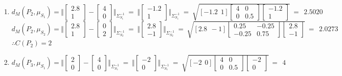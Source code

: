 \documentclass[letterpaper]{article}
\begin{document}
\begin{enumerate}
\begin{enumerate}
	\item[(ii)] $ d_{M}(P_2 , \mu_{S_1}) = \Vert \begin{bmatrix} 2.8 \\ 1\end{bmatrix} - \begin{bmatrix} 4 \\ 0\end{bmatrix} \Vert_{\Sigma^{-1}_{S_1}} ~=~ \Vert \begin{bmatrix} -1.2 \\ 1\end{bmatrix} \Vert_{\Sigma^{-1}_{S_1}} ~=
	~ \sqrt{[-1.2 ~~ 1] \begin{bmatrix}4 & 0 \\ 0 & 0.5\end{bmatrix} \begin{bmatrix}-1.2 \\ 1 \end{bmatrix}} ~=~~2.5020$	\\ \vskip 1mm	
	$ d_{M}(P_2 , \mu_{S_2}) = \Vert \begin{bmatrix} 2.8 \\ 1\end{bmatrix} - \begin{bmatrix} 0 \\ 2\end{bmatrix} \Vert_{\Sigma^{-1}_{S_2}} ~=~ \Vert \begin{bmatrix} 2.8 \\ -1\end{bmatrix} \Vert_{\Sigma^{-1}_{S_2}} ~=
	~ \sqrt{[2.8 ~~ -1] \begin{bmatrix}0.25 & -0.25 \\ -0.25 & 0.75\end{bmatrix} \begin{bmatrix}2.8 \\ -1 \end{bmatrix}} ~=~~ 2.0273$	\\ \vskip 1mm
	$\therefore C(P_2) = 2$
	
	\item[(ii)] $ d_{M}(P_3 , \mu_{S_1}) = \Vert \begin{bmatrix} 2 \\ 0\end{bmatrix} - \begin{bmatrix} 4 \\ 0\end{bmatrix} \Vert_{\Sigma^{-1}_{S_1}} ~=~ \Vert \begin{bmatrix} -2 \\ 0\end{bmatrix} \Vert_{\Sigma^{-1}_{S_1}} ~=
	~ \sqrt{[-2 ~~ 0] \begin{bmatrix}4 & 0 \\ 0 & 0.5\end{bmatrix} \begin{bmatrix}-2 \\ 0 \end{bmatrix}} ~=~~4$	\\ \vskip 1mm
		

\end{enumerate}
\end{enumerate}
\end{document}

